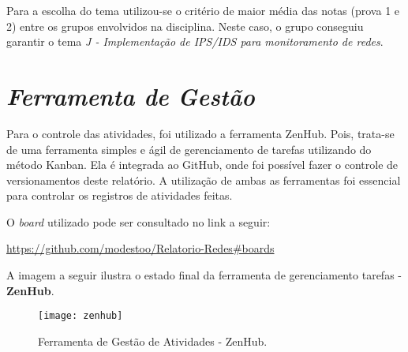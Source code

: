 		Para a escolha do tema utilizou-se o critério de maior média das notas (prova 1 e 2) entre os grupos envolvidos na disciplina. Neste caso, o grupo conseguiu garantir o tema \emph{J - Implementação de IPS/IDS para monitoramento de redes}.  

	\section[Ferramenta de Gestão]{\emph{Ferramenta de Gestão}}
	\label{sec:informacoesGerais_ferramenta}

		Para o controle das atividades, foi utilizado a ferramenta ZenHub. Pois, trata-se de uma ferramenta simples e ágil de gerenciamento de tarefas utilizando do método Kanban. Ela é integrada ao GitHub, onde foi possível fazer o controle de versionamentos deste relatório. A utilização de ambas as ferramentas foi essencial para controlar os registros de atividades feitas.

		O \emph{board} utilizado pode ser consultado no link a seguir:
		\begin{center}
			\href{https://github.com/modestoo/Relatorio-Redes#boards}{https://github.com/modestoo/Relatorio-Redes\#boards}
		\end{center}

		A imagem a seguir ilustra o estado final da ferramenta de gerenciamento tarefas - \textbf{ZenHub}.
		\newpage

		\begin{landscape}
			\begin{figure}[h]
				\centering
				\texttt{[image: zenhub]}
				\caption{Ferramenta de Gestão de Atividades - ZenHub.}
				\label{fig:zenhub}
			\end{figure}
		\end{landscape}